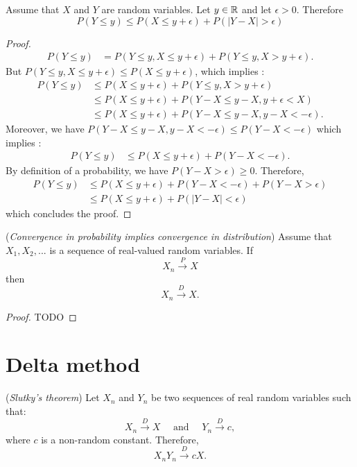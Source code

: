 \documentclass{article}
\begin{document}
\begin{theorem}
\label{theo-doubleproba}
Assume that $X$ and $Y$ are random variables. 
Let $y\in\mathbb{R}$ and let $\epsilon>0$. 
Therefore
$$
P(Y\leq y) \leq P(X\leq y+\epsilon) + P(|Y-X|> \epsilon)
$$
\end{theorem}

\begin{proof}
\begin{align*}
P(Y\leq y)
& = P(Y\leq y,X\leq y+\epsilon)+P(Y\leq y,X> y+\epsilon).
\end{align*}
But $P(Y\leq y,X\leq y+\epsilon) \leq P(X\leq y+\epsilon)$, which implies :
\begin{align*}
P(Y\leq y)
& \leq P(X\leq y+\epsilon)+P(Y\leq y,X> y+\epsilon) \\
& \leq P(X\leq y+\epsilon)+P(Y-X\leq y-X, y+\epsilon<X) \\
& \leq P(X\leq y+\epsilon)+P(Y-X\leq y-X, y-X <-\epsilon).
\end{align*}
Moreover, we have $P(Y-X\leq y-X, y-X <-\epsilon)\leq P(Y-X<-\epsilon)$ which implies : 
\begin{align*}
P(Y\leq y)
& \leq P(X\leq y+\epsilon)+P(Y-X<-\epsilon).
\end{align*}
By definition of a probability, we have $P(Y-X>\epsilon)\geq 0$. 
Therefore, 
\begin{align*}
P(Y\leq y)
& \leq P(X\leq y+\epsilon)+P(Y-X<-\epsilon) + P(Y-X>\epsilon) \\
& \leq P(X\leq y+\epsilon)+P(|Y-X|<\epsilon) 
\end{align*}
which concludes the proof.
\end{proof}

\begin{theorem}
(\emph{Convergence in probability implies convergence in distribution})
Assume that $X_1,X_2,...$ is a sequence of real-valued random variables. 
If 
$$
X_n \xrightarrow{P} X
$$
then
$$
X_n \xrightarrow{D} X.
$$
\end{theorem}

\begin{proof}
TODO
\end{proof}


\section{Delta method}

\begin{theorem}
(\emph{Slutky's theorem})
Let $X_n$ and $Y_n$ be two sequences of real random variables such that:
$$
X_n \xrightarrow{D} X \quad \textrm{ and } \quad Y_n \xrightarrow{D} c,
$$
where $c$ is a non-random constant. 
Therefore, 
$$
X_n Y_n \xrightarrow{D} c X.
$$
\end{theorem}
\end{document}
